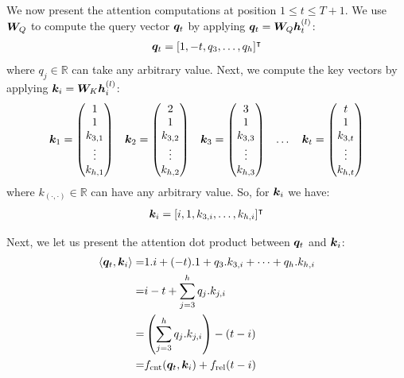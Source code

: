 \documentclass{article}
\begin{document}
We now present the attention computations at position $1 \le t \le T+1$. We use ${\bm{W}}_Q$ to compute the query vector ${\bm{q}}_t$ by applying ${\bm{q}}_t = {\bm{W}}_Q{\bm{h}}_t^{(l)}$:
\begin{align}
  \label{eq:rel_query_vec}
  {\bm{q}}_t = [1, -t, q_3, \dots, q_h]^\intercal
\end{align}
where $q_j \in \mathbb{R}$ can take any arbitrary value. Next, we compute the key vectors by applying ${\bm{k}}_i = {\bm{W}}_K{\bm{h}}_i^{(l)}$:
\begin{align}
  \label{eq:rel_key_vec}
  \begin{array}{ccccc}
    {\bm{k}}_1 = \begin{pmatrix} 1 \\ 1 \\ k_{3, 1} \\ \vdots \\ k_{h, 1} \end{pmatrix} &
    {\bm{k}}_2 = \begin{pmatrix} 2 \\ 1 \\ k_{3, 2} \\ \vdots \\ k_{h, 2} \end{pmatrix} &
    {\bm{k}}_3 = \begin{pmatrix} 3 \\ 1 \\ k_{3, 3} \\ \vdots \\ k_{h, 3} \end{pmatrix} &
    \dots                                                                          &
    {\bm{k}}_{t} = \begin{pmatrix} t \\ 1 \\ k_{3, t} \\ \vdots \\ k_{h, t} \end{pmatrix}
  \end{array}
\end{align}
where $k_{(\cdot, \cdot)} \in \mathbb{R}$ can have any arbitrary value. So, for ${\bm{k}}_i$ we have:
\begin{align}
  \label{eq:rel_key_vec_2}
  {\bm{k}}_i = [i, 1, k_{3,i}, \dots, k_{h, i}]^\intercal
\end{align}

Next, we let us present the attention dot product between ${\bm{q}}_t$ and ${\bm{k}}_i$:
\begin{align}
  \label{eq:rel_attention_dot_product}
  \langle {\bm{q}}_t, {\bm{k}}_i \rangle = & 1.i + (-t).1 + q_3.k_{3,i} + \dots + q_h.k_{h,i}   \\
  =                              & i - t + \sum_{j=3}^{h} q_j.k_{j,i}                 \\
  =                              & \left(\sum_{j=3}^{h} q_j.k_{j,i}\right) - (t-i)    \\
  =                              & f_\mathrm{cnt}({\bm{q}}_t, {\bm{k}}_i) + f_\mathrm{rel}(t-i)
\end{align}
\end{document}
